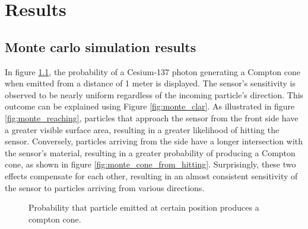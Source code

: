 
\chapter{Results\label{chap:results}}

\mycomment{%
    This section describes experiments and evaluation of performance of the proposed method for mapping of ionizing radiation.
    An experiment with real sources of ionizing radiation requires (due to specific safety measures, permission from the state authorities...) coordination with other institutions, such as Czech metrology institute.
    Unfortunately, it was not possible to perform experiment with real sources before the deadline of the thesis due to these organizational reasons.
    However, the method was evaluated on pre-recorded data from real-world experiments as well as using the realistic simulator for compton camera \cite{TODO}.
}%

\section{Monte carlo simulation results}
In figure \ref{fig:monte_cs_results}, the probability of a Cesium-137 photon generating a Compton cone when emitted from a distance of 1 meter is displayed. 
The sensor's sensitivity is observed to be nearly uniform regardless of the incoming particle's direction. 
This outcome can be explained using Figure \ref{fig:monte_clar}. 
As illustrated in figure \ref{fig:monte_reaching}, particles that approach the sensor from the front side have a greater visible surface area, resulting in a greater likelihood of hitting the sensor. 
Conversely, particles arriving from the side have a longer intersection with the sensor's material, resulting in a greater probability of producing a Compton cone, as shown in figure \ref{fig:monte_cone_from_hitting}. 
Surprisingly, these two effects compensate for each other, resulting in an almost consistent sensitivity of the sensor to particles arriving from various directions.

\begin{figure}[!htb]
  \centering
  \caption{Probability that particle emitted at certain position produces a compton cone.}
  \label{fig:monte_cs_results}
\end{figure}

